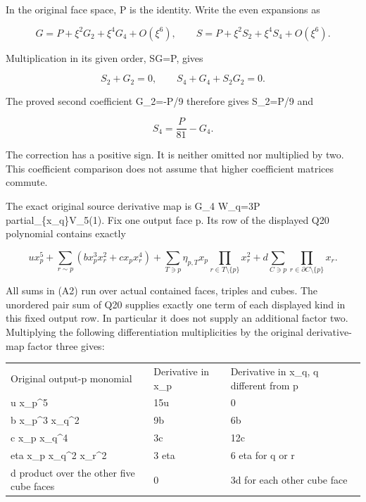 \documentclass[11pt]{article}
\begin{document}
In the original face space, P is the identity. Write the even expansions as

\[
 G=P+\xi^2G_2+\xi^4G_4+O(\xi^6),\qquad
 S=P+\xi^2S_2+\xi^4S_4+O(\xi^6).
\]

Multiplication in its given order, SG=P, gives

\[
 S_2+G_2=0,\qquad S_4+G_4+S_2G_2=0.
\]

The proved second coefficient G\_2=-P/9 therefore gives S\_2=P/9 and

\[
 S_4=\frac P{81}-G_4. \tag{A1}
\]

The correction has a positive sign. It is neither omitted nor multiplied by two. This coefficient comparison does not assume that higher coefficient matrices commute.

The exact original source derivative map is G\_4 W\_q=3P partial\_\{x\_q\}V\_5(1). Fix one output face p. Its row of the displayed Q20 polynomial contains exactly

\[
 u x_p^5
 +\sum_{r\sim p}(b x_p^3x_r^2+c x_px_r^4)
 +\sum_{T\ni p}\eta_{p,T}x_p\prod_{r\in T\setminus\{p\}}x_r^2
 +d\sum_{C\ni p}\prod_{r\in\partial C\setminus\{p\}}x_r.
 \tag{A2}
\]

All sums in (A2) run over actual contained faces, triples and cubes. The unordered pair sum of Q20 supplies exactly one term of each displayed kind in this fixed output row. In particular it does not supply an additional factor two. Multiplying the following differentiation multiplicities by the original derivative-map factor three gives:

\begingroup\small\setlength{\tabcolsep}{3pt}\begin{longtable}{@{}p{}p{}p{}@{}}\toprule
Original output-p monomial & Derivative in x\_p & Derivative in x\_q, q different from p\\
u x\_p\textasciicircum{}5 & 15u & 0\\
b x\_p\textasciicircum{}3 x\_q\textasciicircum{}2 & 9b & 6b\\
c x\_p x\_q\textasciicircum{}4 & 3c & 12c\\
eta x\_p x\_q\textasciicircum{}2 x\_r\textasciicircum{}2 & 3 eta & 6 eta for q or r\\
d product over the other five cube faces & 0 & 3d for each other cube face\\
\bottomrule\end{longtable}\endgroup
\end{document}
